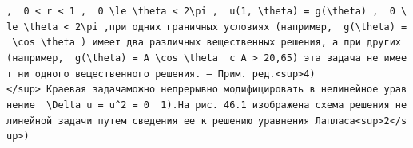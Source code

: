 \documentclass[
  ukrainian,
]{article}
\begin{document}
\texttt{,\ \ \textquotesingle{}0\ \textless{}\ r\ \textless{}\ 1\textquotesingle{}\ ,\ \ \textquotesingle{}0\ \textbackslash{}le\ \textbackslash{}theta\ \textless{}\ 2\textbackslash{}pi\textquotesingle{}\ ,\ \ \textquotesingle{}u(1,\ \textbackslash{}theta)\ =\ g(\textbackslash{}theta)\textquotesingle{}\ ,\ \ \textquotesingle{}0\ \textbackslash{}le\ \textbackslash{}theta\ \textless{}\ 2\textbackslash{}pi\textquotesingle{}\ ,при\ одних\ граничных\ условиях\ (например,\ \ \textquotesingle{}g(\textbackslash{}theta)\ =\ \textbackslash{}cos\ \textbackslash{}theta\textquotesingle{}\ )\ имеет\ два\ различных\ вещественных\ решения,\ а\ при\ других\ (например,\ \ \textquotesingle{}g(\textbackslash{}theta)\ =\ A\ \textbackslash{}cos\ \textbackslash{}theta\textquotesingle{}\ \ с\ A\ \textgreater{}\ 20,65)\ эта\ задача\ не\ имеет\ ни\ одного\ вещественного\ решения.\ —\ Прим.\ ред.\textless{}sup\textgreater{}4)\textless{}/sup\textgreater{}\ Краевая\ задачаможно\ непрерывно\ модифицировать\ в\ нелинейное\ уравнение\ \ \textquotesingle{}\textbackslash{}Delta\ u\ =\ u\^{}2\ =\ 0\textquotesingle{}\ \ 1).На\ рис.\ 46.1\ изображена\ схема\ решения\ нелинейной\ задачи\ путем\ сведения\ ее\ к\ решению\ уравнения\ Лапласа\textless{}sup\textgreater{}2\textless{}/sup\textgreater{})}
\end{document}
